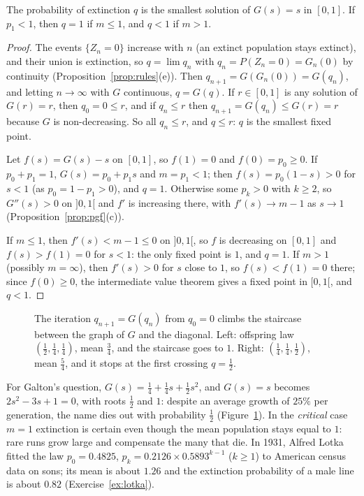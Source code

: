 \begin{theorem}[extinction]\label{thm:extinction}
The probability of extinction $q$ is the smallest solution of $G(s)=s$ in $[0,1]$. If $p_1<1$, then $q=1$ if
$m\le1$, and $q<1$ if $m>1$.
\end{theorem}
\begin{proof}
The events $\{Z_n=0\}$ increase with $n$ (an extinct population stays extinct), and their union is extinction, so
$q=\lim q_n$ with $q_n=P(Z_n=0)=G_n(0)$ by continuity (Proposition~\ref{prop:rules}(e)). Then
$q_{n+1}=G(G_n(0))=G(q_n)$, and letting $n\to\infty$ with $G$ continuous, $q=G(q)$. If $r\in[0,1]$ is any solution of
$G(r)=r$, then $q_0=0\le r$, and if $q_n\le r$ then $q_{n+1}=G(q_n)\le G(r)=r$ because $G$ is non-decreasing. So all
$q_n\le r$, and $q\le r$: $q$ is the smallest fixed point.

Let $f(s)=G(s)-s$ on $[0,1]$, so $f(1)=0$ and $f(0)=p_0\ge0$. If $p_0+p_1=1$, $G(s)=p_0+p_1s$ and $m=p_1<1$; then $f(s)=p_0(1-s)>0$ for
$s<1$ (as $p_0=1-p_1>0$), and $q=1$. Otherwise some $p_k>0$ with $k\ge2$, so $G''(s)>0$ on $]0,1[$ and $f'$ is increasing
there, with $f'(s)\to m-1$ as $s\to1$ (Proposition~\ref{prop:pgf}(c)).

If $m\le1$, then $f'(s)<m-1\le0$ on $]0,1[$, so $f$ is decreasing on $[0,1]$ and $f(s)>f(1)=0$ for $s<1$: the only fixed point
is $1$, and $q=1$. If $m>1$ (possibly $m=\infty$), then $f'(s)>0$ for $s$ close to $1$, so $f(s)<f(1)=0$ there; since $f(0)\ge0$,
the intermediate value theorem gives a fixed point in $[0,1[$, and $q<1$.
\end{proof}

\begin{figure}[ht]
\centering
{}
\caption{The iteration $q_{n+1}=G(q_n)$ from $q_0=0$ climbs the staircase between the graph of $G$ and the diagonal.
Left: offspring law $(\frac12,\frac14,\frac14)$, mean $\frac34$, and the staircase goes to $1$. Right: $(\frac14,\frac14,\frac12)$, mean $\frac54$,
and it stops at the first crossing $q=\frac12$.}
\label{fig:cobweb}
\end{figure}

For Galton's question, $G(s)=\frac14+\frac14s+\frac12s^2$, and $G(s)=s$ becomes $2s^2-3s+1=0$, with roots $\frac12$ and $1$: despite
an average growth of $25\%$ per generation, the name dies out with probability $\frac12$ (Figure~\ref{fig:cobweb}). In the
\emph{critical} case $m=1$ extinction is certain even though the mean population stays equal to $1$: rare runs
grow large and compensate the many that die. In 1931, Alfred Lotka fitted the law
$p_0=0.4825$, $p_k=0.2126\times0.5893^{k-1}$ ($k\ge1$) to American census data on sons; its mean is about $1.26$ and the
extinction probability of a male line is about $0.82$ (Exercise~\ref{ex:lotka}).

